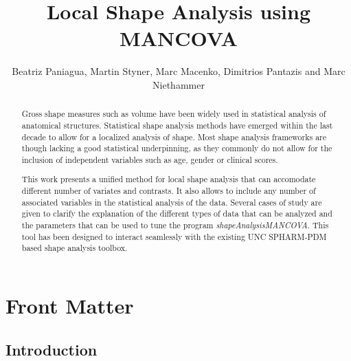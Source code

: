 \documentclass{InsightArticle}
\title{Local Shape Analysis using MANCOVA}
\author{Beatriz Paniagua, Martin Styner, Marc Macenko, Dimitrios Pantazis and Marc Niethammer}
\newcommand{\IJhandlerIDnumber}{1338}
\newcommand{\ProgramName}{\textit{shapeAnalysisMANCOVA}}
\begin{document}
%
% 
\IJhandlefooter{\IJhandlerIDnumber}
\maketitle


\ifhtml
\chapter*{Front Matter\label{front}}
\fi


\begin{abstract}
\noindent

Gross shape measures such as volume have been widely used in statistical analysis of anatomical structures. Statistical shape analysis methods have emerged within the last decade to allow for a localized analysis of shape. Most shape analysis frameworks are though lacking a good statistical underpinning, as they commonly do not allow for the inclusion of independent variables such as age, gender or clinical scores.

This work presents a unified method for local shape analysis that can accomodate different number of variates and contrasts. It also allows to include any number of associated variables in the statistical analysis of the data. Several cases of study are given to clarify the explanation of the different types of data that can be analyzed and the parameters that can be used to tune the program \ProgramName. This tool has been designed to interact seamlessly with the existing UNC SPHARM-PDM \cite{Styner06} based shape analysis toolbox.
\end{abstract}

\IJhandlenote{\IJhandlerIDnumber}

\tableofcontents

\section{Introduction}
\label{sec:intro}
\end{document}
